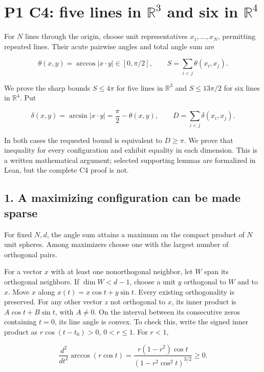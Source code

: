 \documentclass[11pt,a4paper]{article}
\begin{document}
\section{\texorpdfstring{P1 C4: five lines in \(\mathbb R^3\) and six in \(\mathbb R^4\)}{P1 C4: five lines in \textbackslash mathbb R\^{}3 and six in \textbackslash mathbb R\^{}4}}\label{p1-c4-five-lines-in-mathbb-r3-and-six-in-mathbb-r4}

For \(N\) lines through the origin, choose unit representatives \(x_1,\ldots,x_N\), permitting repeated lines. Their acute pairwise angles and total angle sum are

\[
\theta(x,y)=\arccos|x\cdot y|\in[0,\pi/2],\qquad S=\sum_{i<j}\theta(x_i,x_j).
\]

We prove the sharp bounds \(S\le4\pi\) for five lines in \(\mathbb R^3\) and \(S\le13\pi/2\) for six lines in \(\mathbb R^4\). Put

\[
\delta(x,y)=\arcsin|x\cdot y|=\frac{\pi}{2}-\theta(x,y),\qquad D=\sum_{i<j}\delta(x_i,x_j).
\]

In both cases the requested bound is equivalent to \(D\ge\pi\). We prove that inequality for every configuration and exhibit equality in each dimension. This is a written mathematical argument; selected supporting lemmas are formalized in Lean, but the complete C4 proof is not.

\subsection{1. A maximizing configuration can be made sparse}\label{a-maximizing-configuration-can-be-made-sparse}

For fixed \(N,d\), the angle sum attains a maximum on the compact product of \(N\) unit spheres. Among maximizers choose one with the largest number of orthogonal pairs.

For a vector \(x\) with at least one nonorthogonal neighbor, let \(W\) span its orthogonal neighbors. If \(\dim W<d-1\), choose a unit \(y\) orthogonal to \(W\) and to \(x\). Move \(x\) along \(x(t)=x\cos t+y\sin t\). Every existing orthogonality is preserved. For any other vector \(z\) not orthogonal to \(x\), its inner product is \(A\cos t+B\sin t\), with \(A\ne0\). On the interval between its consecutive zeros containing \(t=0\), its line angle is convex. To check this, write the signed inner product as \(r\cos(t-t_0)>0\), \(0<r\le1\). For \(r<1\),

\[
\frac{d^2}{dt^2}\arccos(r\cos t)=\frac{r(1-r^2)\cos t}{(1-r^2\cos^2 t)^{3/2}}\ge0.
\]
\end{document}
